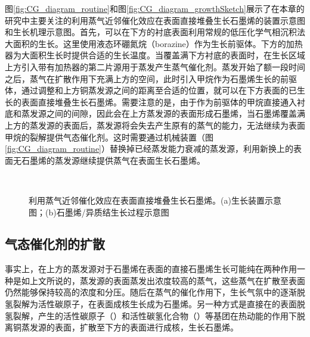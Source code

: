     图\ref{fig:CG_diagram_routine}和图\ref{fig:CG_diagram_growthSketch}展示了在本章的研究中主要关注的利用蒸气近邻催化效应在表面直接堆叠生长石墨烯的装置示意图和生长机理示意图。首先，可以在下方的衬底表面利用常规的低压化学气相沉积法大面积的生长。这里使用液态环硼氮烷（borazine）作为生长前驱体。下方的加热器为大面积生长时提供合适的生长温度。当覆盖满下方衬底的表面时，在生长区域上方引入带有加热器的第二片源用于蒸发产生蒸气催化剂。蒸发开始了额一段时间之后，蒸气在扩散作用下充满上方的空间，此时引入甲烷作为石墨烯生长的前驱体，通过调整和上方铜蒸发源之间的距离至合适的位置，就可以在下方表面的已生长的表面直接堆叠生长石墨烯。需要注意的是，由于作为前驱体的甲烷直接通入衬底和蒸发源之间的间隙，因此会在上方蒸发源的表面形成石墨烯，当石墨烯覆盖满上方的蒸发源的表面后，蒸发源将会失去产生原有的蒸气的能力，无法继续为表面甲烷的裂解提供气态催化剂。这时需要通过机械装置（图\ref{fig:CG_diagram_routine}）替换掉已经蒸发能力衰减的蒸发源，利用新换上的表面无石墨烯的蒸发源继续提供蒸气在表面生长石墨烯。

    \begin{figure}[htb]
        \\[-0.5ex]
        \caption{利用蒸气近邻催化效应在表面直接堆叠生长石墨烯。(a)生长装置示意图；(b)石墨烯/异质结生长过程示意图}
        \label{fig:CG_diagram_CVD}
    \end{figure}

    \subsection{气态催化剂的扩散}
    \label{CG:FEM_CuVapor}
    事实上，在上方的蒸发源对于石墨烯在表面的直接石墨烯生长可能纯在两种作用\chinesecolon 一种是如上文所说的，蒸发源的表面蒸发出浓度较高的蒸气，这些蒸气在扩散至表面仍然能够保持较高的浓度和分压。随后在蒸气的催化作用下，生长气氛中的逐渐脱氢裂解为活性碳原子，在表面成核生长成为石墨烯。另一种方式是直接在的表面脱氢裂解，产生的活性碳原子（）和活性碳氢化合物（）等基团在热动能的作用下脱离铜蒸发源的表面，扩散至下方的表面进行成核，生长石墨烯。

